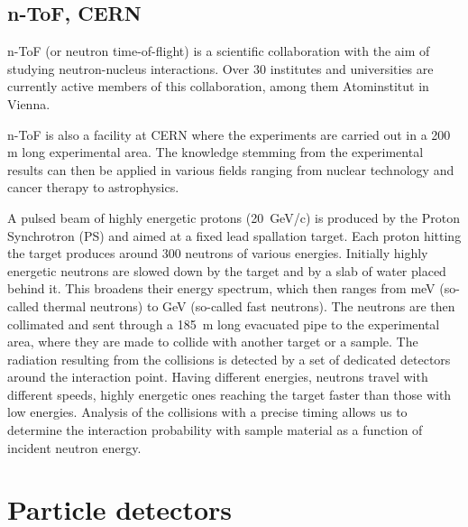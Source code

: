 \documentclass[12pt]{packages/mytustyle}  %
\begin{document}



\subsection{n-ToF, CERN}
n-ToF (or neutron time-of-flight) is a scientific collaboration with the aim of studying neutron-nucleus interactions. Over 30 institutes and universities are currently active members of this collaboration, among them Atominstitut in Vienna.

n-ToF is also a facility at CERN where the experiments are carried out in a 200 m long experimental area. The knowledge stemming from the experimental results can then be applied in various fields ranging from nuclear technology and cancer therapy to astrophysics.

A pulsed beam of highly energetic protons (20~GeV/c) is produced by the Proton Synchrotron (PS) and aimed at a fixed lead spallation target. Each proton hitting the target produces around 300 neutrons of various energies. Initially highly energetic neutrons are slowed down by the target and by a slab of water placed behind it. This broadens their energy spectrum, which then ranges from meV (so-called thermal neutrons) to GeV (so-called fast neutrons). The neutrons are then collimated and sent through a 185~m long evacuated pipe to the experimental area, where they are made to collide with another target or a sample. The radiation resulting from the collisions is detected by a set of dedicated detectors around the interaction point. Having different energies, neutrons travel with different speeds, highly energetic ones reaching the target faster than those with low energies. Analysis of the collisions with a precise timing allows us to determine the interaction probability with sample material as a function of incident neutron energy.




%


\section{Particle detectors}
\end{document}
